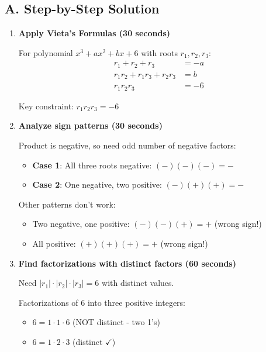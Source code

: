 \documentclass[12pt]{article}
\begin{document}
\begin{solutionbox}
\subsection*{A. Step-by-Step Solution}
\begin{enumerate}[leftmargin=*]
    \item \textbf{Apply Vieta's Formulas (30 seconds)}
    
    For polynomial $x^3 + ax^2 + bx + 6$ with roots $r_1, r_2, r_3$:
    \begin{align*}
        r_1 + r_2 + r_3 &= -a\\
        r_1 r_2 + r_1 r_3 + r_2 r_3 &= b\\
        r_1 r_2 r_3 &= -6
    \end{align*}
    
    Key constraint: $r_1 r_2 r_3 = -6$
    
    \item \textbf{Analyze sign patterns (30 seconds)}
    
    Product is negative, so need odd number of negative factors:
    \begin{itemize}
        \item \textbf{Case 1}: All three roots negative: $(-)(-)(-) = -$
        \item \textbf{Case 2}: One negative, two positive: $(-)(+)(+) = -$
    \end{itemize}
    
    Other patterns don't work:
    \begin{itemize}
        \item Two negative, one positive: $(-)(-)(+) = +$ (wrong sign!)
        \item All positive: $(+)(+)(+) = +$ (wrong sign!)
    \end{itemize}
    
    \item \textbf{Find factorizations with distinct factors (60 seconds)}
    
    Need $|r_1| \cdot |r_2| \cdot |r_3| = 6$ with distinct values.
    
    Factorizations of 6 into three positive integers:
    \begin{itemize}
        \item $6 = 1 \cdot 1 \cdot 6$ (NOT distinct - two 1's)
        \item $6 = 1 \cdot 2 \cdot 3$ (distinct $\checkmark$)
    \end{itemize}
    

\end{enumerate}
\end{solutionbox}
\end{document}
